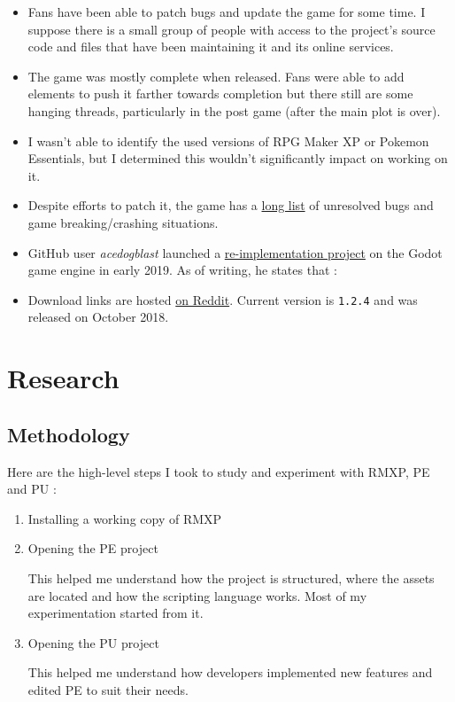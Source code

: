 \documentclass[11pt]{article}
\begin{document}
\begin{itemize}
	\item Fans have been able to patch bugs and update the game for some time. I suppose there is a small group of people with access to the project's source code and files that have been maintaining it and its online services.
	
	\item The game was mostly complete when released. Fans were able to add elements to push it farther towards completion but there still are some hanging threads, particularly in the post game (after the main plot is over).
	
	\item I wasn't able to identify the used versions of RPG Maker XP or Pokemon Essentials, but I determined this wouldn't significantly impact on working on it.
	
	\item Despite efforts to patch it, the game has a \href{https://pokemon-uranium.fandom.com/wiki/Bugs_and_Errors}{long list} of unresolved bugs and game breaking/crashing situations.
	
	\item GitHub user \textit{acedogblast} launched a \href{https://github.com/acedogblast/Project-Uranium-Godot}{re-implementation project} on the Godot game engine in early 2019. As of writing, he states that :
	
	\item Download links are hosted \href{https://www.reddit.com/r/pokemonuranium/comments/a0cw0i/download_links/}{on Reddit}. Current version is \verb|1.2.4| and was released on October  2018.
\end{itemize}


\newpage
\section{Research}

\subsection{Methodology}

Here are the high-level steps I took to study and experiment with RMXP, PE and PU :
\begin{enumerate}
	\item Installing a working copy of RMXP

	\item Opening the PE project
	
	This helped me understand how the project is structured, where the assets are located and how the scripting language works. Most of my experimentation started from it.
	
	\item Opening the PU project
	
	This helped me understand how developers implemented new features and edited PE to suit their needs.
\end{enumerate}
\end{document}
